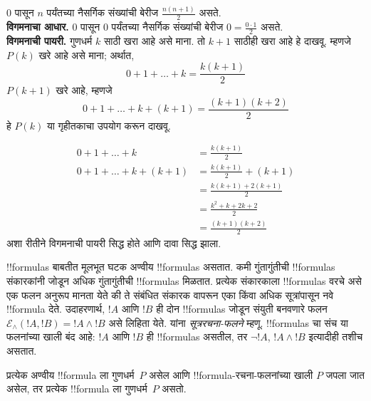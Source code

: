 \documentclass[../../include/open-logic-section]{subfiles}
\begin{document}
\begin{ex} 0 पासून $n$ पर्यंतच्या नैसर्गिक
संख्यांची बेरीज $\frac{n(n+1)}{2}$ असते. \\

\textbf{विगमनाचा आधार.} 0 पासून 0 पर्यंतच्या नैसर्गिक
संख्यांची बेरीज $0=
\frac{0\cdot 1}{2}$ असते.\\

\textbf{विगमनाची पायरी.} गुणधर्म $k$ साठी खरा आहे असे
माना. तो $k+1$ साठीही खरा आहे हे दाखवू. म्हणजे $P(k)$
खरे आहे असे माना; अर्थात,
\[ 0 + 1 + \ldots + k = \frac{k(k+1)}{2} \]
$P(k+1)$ खरे आहे, म्हणजे
\[ 0 + 1 + \ldots + k + (k+1) = \frac{(k+1)(k+2)}{2} \]
हे $P(k)$ या गृहीतकाचा उपयोग करून दाखवू.

\begin{align*}
0 + 1 + \ldots + k &= \frac{k(k+1)}{2} \tag{गृहीतक} \\
0 + 1 + \ldots + k + (k+1) &= \frac{k(k+1)}{2} + (k+1)
\tag{दोन्ही बाजूंना $k+1$ मिळवा} \\
&= \frac{k(k+1) + 2(k+1)}{2} \\
&= \frac{k^2 + k + 2k +2}{2} \\
&=\frac{(k+1)(k+2)}{2}
\end{align*}
अशा रीतीने विगमनाची पायरी सिद्ध होते आणि दावा सिद्ध झाला.
\end{ex}

\begin{explain}
!!{formula}s बाबतीत मूलभूत घटक अण्वीय !!{formula}s असतात.
कमी गुंतागुंतीची !!{formula}s संकारकांनी जोडून अधिक गुंतागुंतीची
!!{formula}s मिळतात. प्रत्येक संकारकाला !!{formula}s वरचे
असे एक फलन अनुरूप मानता येते की ते संबंधित संकारक वापरून
एका किंवा अधिक सूत्रांपासून नवे !!{formula} देते. उदाहरणार्थ,
$!A$ आणि $!B$ ही दोन !!{formula}s जोडून संयुती
बनवणारे फलन $\mathcal E _\land (!A,
!B) = !A \land !B$ असे लिहिता येते. यांना
\emph{सूत्ररचना-फलने} म्हणू. !!{formula}s चा संच या
फलनांच्या खाली बंद आहे: $!A$ आणि $!B$ ही
!!{formula}s असतील, तर $\lnot !A$,
$!A \land
!B$ इत्यादीही तशीच असतात.
\end{explain}

\begin{defn}
प्रत्येक अण्वीय !!{formula} ला गुणधर्म~$P$ असेल आणि
!!{formula}-रचना-फलनांच्या खाली $P$ जपला जात असेल, तर प्रत्येक
!!{formula} ला गुणधर्म~$P$ असतो.
\end{defn}
\end{document}
